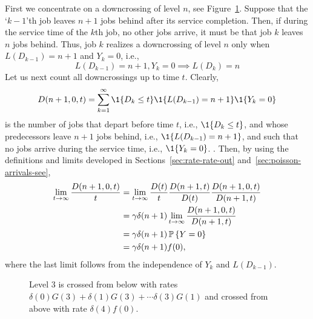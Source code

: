 First we concentrate on a downcrossing of level $n$, see
Figure~\ref{fig:mg1_2}. Suppose that the `$k-1$'th job leaves $n+1$
jobs behind after its service completion. Then, if during the service
time of the $k$th job, no other jobs arrive, it must be that job $k$
leaves $n$ jobs behind. Thus, job $k$ realizes a downcrossing of level
$n$ only when $L(D_{k-1})=n+1$ and $Y_k=0$, i.e.,
\begin{equation*}
  L(D_{k-1})=n+1, Y_k = 0 \implies L(D_k) = n
\end{equation*}
Let us next count all  downcrossings up to time $t$. Clearly, 
\begin{equation*}
  D(n+1, 0, t) = \sum_{k=1}^\infty \1{D_{k}\leq t}\1{L(D_{k-1})=n+1}\1{Y_k=0}
\end{equation*}
is the number of jobs that depart before time $t$, i.e.,
$\1{D_k\leq t}$, and whose predecessors leave $n+1$ jobs behind, i.e.,
$\1{L(D_{k-1})=n+1}$, and such that no jobs arrive during the service
time, i.e., $\1{Y_k=0}$. . Then, by using the definitions and limits
developed in Sections~\ref{sec:rate-rate-out}
and~\ref{sec:poisson-arrivals-see},
\begin{equation*}
  \begin{split}
  \lim_{t\to\infty} \frac{  D(n+1, 0, t)}t 
&=   \lim_{t\to\infty}  \frac{D(t)}t \frac{D(n+1, t)}{D(t)}\frac{ D(n+1, 0, t)}{D(n+1,t)} \\
&=   \gamma \delta(n+1) \lim_{t\to\infty} \frac{ D(n+1, 0, t)}{D(n+1,t)} \\
&=   \gamma \delta(n+1) \P{Y=0}\\
& = \gamma \delta(n+1) f(0),
  \end{split}
\end{equation*}
where the last limit follows from the independence of $Y_k$ and $L(D_{k-1})$. 

\begin{figure}[htb]
  \centering
                  
\caption{Level $3$ is crossed from below with rates
  $\delta(0)G(3) + \delta(1)G(3) + \cdots \delta(3) G(1)$ and crossed
  from above with rate $\delta(4) f(0)$. }
\label{fig:mg1_2}
\end{figure}


